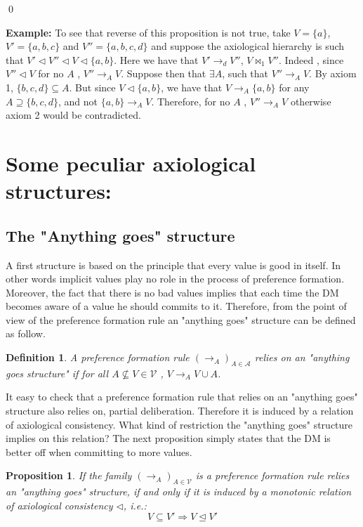 \documentclass[11pt]{article}
\newtheorem{proposition}{Proposition}
\newtheorem{definition}{Definition}
\begin{document}
\qed






\noindent
\textbf{Example: }
To see that reverse of this proposition is not true, take $V= \{a\}$, $V'= \{a,b,c\}$ and $V''=\{a,b,c,d\}$ and suppose the axiological hierarchy is such that $V'\triangleleft V''\triangleleft V \triangleleft \{a,b\}$. Here we have that $V'\rightarrow_d V''$,  $V\bowtie_1 V''$. Indeed ,  since $V''\triangleleft V $ for no $A$ , $V''\rightarrow_A V $. Suppose then that $\exists A$, such that $V''\rightarrow_A V$. By axiom 1, $\{b,c,d\}\subseteq A$. But since $V \triangleleft \{a,b\}$, we have that $V \rightarrow_A \{a,b\}$ for any$A\supseteq \{b,c,d\}$, and not $\{a,b\}\rightarrow_A V$. Therefore, for no $A$ ,  $V''\rightarrow_A V$ otherwise axiom 2 would be contradicted. 

\section{Some peculiar axiological structures: }


\subsection{The "Anything goes" structure}

A first structure is based on the principle that every value is good in itself. In other words implicit values play no role in the process of preference formation. Moreover, the fact that there is no bad values implies that each time the DM becomes aware of a value he should commits to it. Therefore, from the point of view of the preference formation rule an "anything goes" structure can be defined as follow.

\begin{definition} A preference formation rule $(\rightarrow_A)_{A\in \mathcal{A}}$ relies on an "anything goes structure" if 
for all $A \not \subseteq V\in \mathcal{V}$ , $V\rightarrow_{A}V\cup A$.
\end{definition}
It easy to check that a preference formation rule that relies on an "anything goes" structure also relies on, partial deliberation. Therefore it is induced by a relation of axiological consistency. What kind of restriction the "anything goes" structure implies on this relation? The next proposition simply states that the DM is better off when committing to more values.




\begin{proposition}
If the family $(\rightarrow_{A})_{A\in\mathcal{V}}$ is a preference formation rule relies an "anything goes" structure, if and only if it is induced by a monotonic relation of axiological consistency $\triangleleft$, i.e.: \[
V\subseteq V' \Rightarrow V\trianglelefteq V'
\] 
\label{Prop'4}
\end{proposition}
\end{document}
